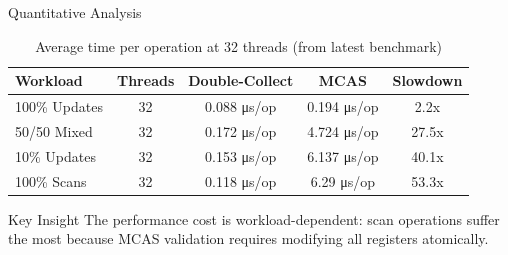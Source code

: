 \documentclass[aspectratio=169]{beamer}
\begin{document}
\begin{frame}{Quantitative Analysis}
    \begin{table}
        \centering
        \begin{tabular}{@{}lcccc@{}}
            \toprule
            Workload & Threads & Double-Collect & MCAS & Slowdown \\
            \midrule
            100\% Updates & 32 & 0.088 μs/op & 0.194 μs/op & 2.2x \\
            50/50 Mixed & 32 & 0.172 μs/op & 4.724 μs/op & 27.5x \\
            10\% Updates & 32 & 0.153 μs/op & 6.137 μs/op & 40.1x \\
            100\% Scans & 32 & 0.118 μs/op & 6.29 μs/op & 53.3x \\
            \bottomrule
        \end{tabular}
        \caption{Average time per operation at 32 threads (from latest benchmark)}
    \end{table}

    \begin{block}{Key Insight}
        The performance cost is workload-dependent: scan operations suffer the most because MCAS validation requires modifying all registers atomically.
    \end{block}
\end{frame}
\end{document}
